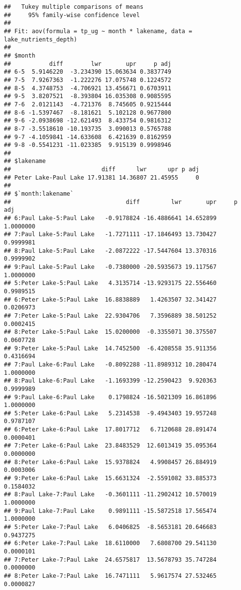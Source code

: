 \documentclass[]{article}
\begin{document}
\begin{verbatim}
##   Tukey multiple comparisons of means
##     95% family-wise confidence level
## 
## Fit: aov(formula = tp_ug ~ month * lakename, data = lake_nutrients_depth)
## 
## $month
##           diff        lwr       upr     p adj
## 6-5  5.9146220  -3.234390 15.063634 0.3837749
## 7-5  7.9267363  -1.222276 17.075748 0.1224572
## 8-5  4.3748753  -4.706921 13.456671 0.6703911
## 9-5  3.8207521  -8.393804 16.035308 0.9085595
## 7-6  2.0121143  -4.721376  8.745605 0.9215444
## 8-6 -1.5397467  -8.181621  5.102128 0.9677800
## 9-6 -2.0938698 -12.621493  8.433754 0.9816312
## 8-7 -3.5518610 -10.193735  3.090013 0.5765788
## 9-7 -4.1059841 -14.633608  6.421639 0.8162959
## 9-8 -0.5541231 -11.023385  9.915139 0.9998946
## 
## $lakename
##                          diff      lwr      upr p adj
## Peter Lake-Paul Lake 17.91381 14.36807 21.45955     0
## 
## $`month:lakename`
##                                 diff         lwr       upr     p adj
## 6:Paul Lake-5:Paul Lake   -0.9178824 -16.4886641 14.652899 1.0000000
## 7:Paul Lake-5:Paul Lake   -1.7271111 -17.1846493 13.730427 0.9999981
## 8:Paul Lake-5:Paul Lake   -2.0872222 -17.5447604 13.370316 0.9999902
## 9:Paul Lake-5:Paul Lake   -0.7380000 -20.5935673 19.117567 1.0000000
## 5:Peter Lake-5:Paul Lake   4.3135714 -13.9293175 22.556460 0.9989515
## 6:Peter Lake-5:Paul Lake  16.8838889   1.4263507 32.341427 0.0206973
## 7:Peter Lake-5:Paul Lake  22.9304706   7.3596889 38.501252 0.0002415
## 8:Peter Lake-5:Paul Lake  15.0200000  -0.3355071 30.375507 0.0607728
## 9:Peter Lake-5:Paul Lake  14.7452500  -6.4208558 35.911356 0.4316694
## 7:Paul Lake-6:Paul Lake   -0.8092288 -11.8989312 10.280474 1.0000000
## 8:Paul Lake-6:Paul Lake   -1.1693399 -12.2590423  9.920363 0.9999989
## 9:Paul Lake-6:Paul Lake    0.1798824 -16.5021309 16.861896 1.0000000
## 5:Peter Lake-6:Paul Lake   5.2314538  -9.4943403 19.957248 0.9787107
## 6:Peter Lake-6:Paul Lake  17.8017712   6.7120688 28.891474 0.0000401
## 7:Peter Lake-6:Paul Lake  23.8483529  12.6013419 35.095364 0.0000000
## 8:Peter Lake-6:Paul Lake  15.9378824   4.9908457 26.884919 0.0003006
## 9:Peter Lake-6:Paul Lake  15.6631324  -2.5591082 33.885373 0.1584032
## 8:Paul Lake-7:Paul Lake   -0.3601111 -11.2902412 10.570019 1.0000000
## 9:Paul Lake-7:Paul Lake    0.9891111 -15.5872518 17.565474 1.0000000
## 5:Peter Lake-7:Paul Lake   6.0406825  -8.5653181 20.646683 0.9437275
## 6:Peter Lake-7:Paul Lake  18.6110000   7.6808700 29.541130 0.0000101
## 7:Peter Lake-7:Paul Lake  24.6575817  13.5678793 35.747284 0.0000000
## 8:Peter Lake-7:Paul Lake  16.7471111   5.9617574 27.532465 0.0000827

\end{verbatim}
\end{document}
